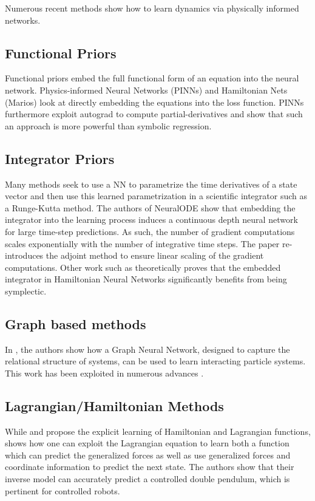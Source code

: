 \documentclass[twoside]{article}
\begin{document}
Numerous recent methods show how to learn dynamics via physically informed networks.
\subsection{Functional Priors}
Functional priors embed the full functional form of an equation into the neural network. Physics-informed Neural Networks (PINNs) \cite{raissi_physics_2017,raissi_physics-informed_2019} and Hamiltonian Nets (Marios) look at directly embedding the equations into the loss function. PINNs furthermore exploit autograd to compute partial-derivatives and show that such an approach is more powerful than symbolic regression.

\subsection{Integrator Priors}
Many methods seek to use a NN to parametrize the time derivatives of a state vector and then use this learned parametrization in a scientific integrator such as a Runge-Kutta method. The authors of NeuralODE \cite{chen_neural_2018} show that embedding the integrator into the learning process induces a continuous depth neural network for large time-step predictions. As such, the number of gradient computations scales exponentially with the number of integrative time steps. The paper re-introduces the adjoint method to ensure linear scaling of the gradient computations. Other work such as \cite{zhu_deep_2020} theoretically proves that the embedded integrator in Hamiltonian Neural Networks significantly benefits from being symplectic. 

\subsection{Graph based methods}
In \cite{battaglia_interaction_2016}, the authors show how a Graph Neural Network, designed to capture the relational structure of systems, can be used to learn interacting particle systems. This work has been exploited in numerous advances \cite{sanchez-gonzalez_graph_2018,sanchez-gonzalez_learning_2020,cranmer_lagrangian_2020}.

\subsection{Lagrangian/Hamiltonian Methods}
While \cite{cranmer_lagrangian_2020} and \cite{greydanus_hamiltonian_2019} propose the explicit learning of Hamiltonian and Lagrangian functions, \cite{lutter_deep_2019} shows how one can exploit the Lagrangian equation to learn both a function which can predict the generalized forces as well as use generalized forces and coordinate information to predict the next state. The authors show that their inverse model can accurately predict a controlled double pendulum, which is pertinent for controlled robots.
\end{document}
